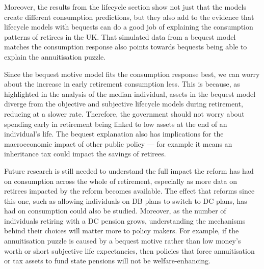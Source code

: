 \documentclass[12pt]{article}
\begin{document}
Moreover, the results from the lifecycle section show not just that the models
create different consumption predictions, but they also add to the evidence that
lifecycle models with bequests can do a good job of explaining the consumption
patterns of retirees in the UK. That simulated data from a bequest model matches
the consumption response also points towards bequests being able to explain the
annuitisation puzzle.

Since the bequest motive model fits the consumption response best, we can worry
about the increase in early retirement consumption less. This is because, as
highlighted in the analysis of the median individual, assets in the bequest model
diverge from the objective and subjective lifecycle models during retirement,
reducing at a slower rate. Therefore, the government should not worry about
spending early in retirement being linked to low assets at the end of an
individual's life. The bequest explanation also has implications for the
macroeconomic impact of other public policy --- for example it means an
inheritance tax could impact the savings of retirees.

Future research is still needed to understand the full impact the reform has had
on consumption across the whole of retirement, especially as more data on
retirees impacted by the reform becomes available. The effect that reforms since
this one, such as allowing individuals on DB plans to switch to DC plans, has
had on consumption could also be studied. Moreover, as the number of individuals
retiring with a DC pension grows, understanding the mechanisms
behind their choices will matter more to policy makers. For example, if the
annuitisation puzzle is caused by a bequest motive rather than low money's worth
or short subjective life expectancies, then policies that force annuitisation or
tax assets to fund state pensions will not be welfare-enhancing.


\printbibliography
% 
\end{document}
